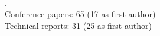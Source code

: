\nocite{*}
\printbibliography[title={Refereed Journal Articles}]
\\
.\\
Conference papers: 65 (17 as first author)\\ %
Technical reports: 31 (25 as first author)\\ %